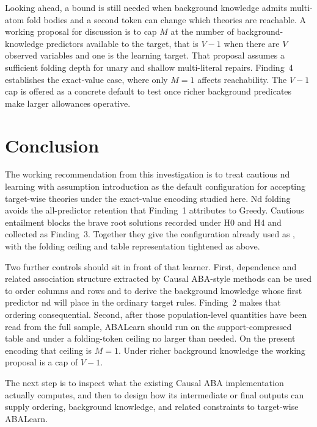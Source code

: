 \documentclass[11pt]{article}
\DeclareRobustCommand{\code}[1]{\texttt{\detokenize{#1}}}
\begin{document}
Looking ahead, a bound is still needed when background knowledge admits
multi-atom fold bodies and a second token can change which theories are
reachable. A working proposal for discussion is to cap \(M\) at the number of
background-knowledge predictors available to the target, that is \(V-1\) when
there are \(V\) observed variables and one is the learning target. That
proposal assumes a sufficient folding depth for unary and shallow multi-literal
repairs. Finding~4 establishes the exact-value case, where only \(M=1\)
affects reachability. The \(V-1\) cap is offered as a concrete default to test
once richer background predicates make larger allowances operative.

\section{Conclusion}

The working recommendation from this investigation is to treat cautious nd
learning with \code{relto} assumption introduction as the default configuration
for accepting target-wise theories under the exact-value encoding studied here. Nd folding avoids the all-predictor
retention that Finding~1 attributes to Greedy. Cautious entailment blocks the
brave root solutions recorded under H0 and H4 and collected as Finding~3. 
Together they give the configuration already used as \code{baseline_cautious},
with the folding ceiling and table representation tightened as above.

Two further controls should sit in front of that learner. First, dependence
and related association structure extracted by Causal ABA-style methods can be
used to order columns and rows and to derive the background knowledge whose
first predictor nd will place in the ordinary target rules. Finding~2 makes
that ordering consequential. Second, after those population-level quantities
have been read from the full sample, ABALearn should run on the
support-compressed table and under a folding-token ceiling no larger than
needed. On the present encoding that ceiling is \(M=1\). Under richer
background knowledge the working proposal is a cap of \(V-1\).

The next step is to inspect what the existing Causal ABA implementation
actually computes, and then to design how its intermediate or final outputs can supply ordering,
background knowledge, and related constraints to target-wise ABALearn.
\end{document}
